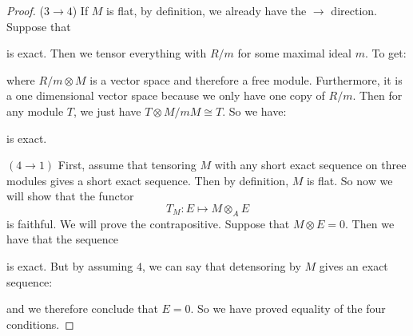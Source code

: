 \documentclass{article}
\begin{document}
\begin{proof}
        ($3 \rightarrow 4$) If $M$ is flat, by definition, we already have the $\rightarrow$ direction. Suppose that
            \begin{center}
            \end{center}
        is exact. Then we tensor everything with $R/m$ for some maximal ideal $m$. To get:
            \begin{center}
            \end{center}
        where $R/m \otimes M$ is a vector space and therefore a free module. Furthermore, it is a one dimensional vector space because we only have one copy of $R/m$. Then for any module $T$, we just have $T \otimes M/mM \cong T$. So we have:
            \begin{center}
            \end{center}
        is exact.

        $(4 \rightarrow 1)$ First, assume that tensoring $M$ with any short exact sequence on three modules gives a short exact sequence. Then by definition, $M$ is flat. So now we will show that the functor
            \begin{equation*}
                T_{M} : E \mapsto M \otimes_{A}E
            \end{equation*}
        is faithful. We will prove the contrapositive. Suppose that $M  \otimes E = 0$. Then we have that the sequence 
            \begin{center}
            \end{center}
        is exact. But by assuming $4$, we can say that detensoring by $M$ gives an exact sequence:
            \begin{center}
            \end{center}
        and we therefore conclude that $E = 0$. So we have proved equality of the four conditions.
    \end{proof}
\end{document}
